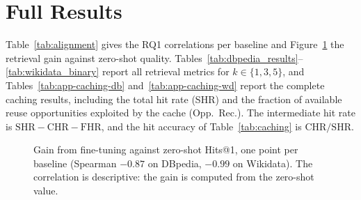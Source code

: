 \documentclass[runningheads]{llncs}
\begin{document}



\clearpage
\appendix
\renewcommand{\theHsection}{appendix.\Alph{section}}
\section{Full Results}
\label{app:full}

Table~\ref{tab:alignment} gives the RQ1 correlations per baseline and
Figure~\ref{fig:gain} the retrieval gain against zero-shot quality.
Tables~\ref{tab:dbpedia_results}--\ref{tab:wikidata_binary} report all
retrieval metrics for $k \in \{1,3,5\}$, and
Tables~\ref{tab:app-caching-db} and~\ref{tab:app-caching-wd} report the
complete caching results, including the total hit rate (SHR) and the
fraction of available reuse opportunities exploited by the cache
(Opp.~Rec.). The intermediate hit rate is $\mathrm{SHR} - \mathrm{CHR} -
\mathrm{FHR}$, and the hit accuracy of Table~\ref{tab:caching} is
$\mathrm{CHR}/\mathrm{SHR}$.


\begin{figure}[htbp]
\centering
{}
\caption{Gain from fine-tuning against zero-shot Hits@1, one point per
baseline (Spearman $-0.87$ on DBpedia, $-0.99$ on Wikidata). The
correlation is descriptive: the gain is computed from the zero-shot value.}
\label{fig:gain}
\end{figure}
\end{document}
